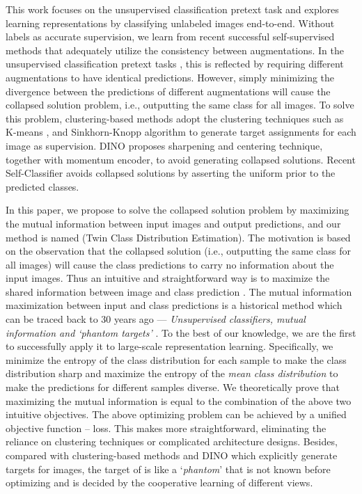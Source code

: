 \documentclass[10pt,twocolumn,letterpaper]{article}
\begin{document}
This work focuses on the unsupervised classification pretext task and explores learning representations by classifying unlabeled images end-to-end. Without labels as accurate supervision, we learn from recent successful self-supervised methods \cite{he2020momentum, chen2020simple, caron2020unsupervised, caron2021emerging} that adequately utilize the consistency between augmentations. In the unsupervised classification pretext tasks \cite{caron2020unsupervised, caron2021emerging}, this is reflected by requiring different augmentations to have identical predictions.
However, simply minimizing the divergence between the predictions of different augmentations will cause the collapsed solution problem, i.e., outputting the same class for all images. To solve this problem, clustering-based methods \cite{caron2018deep, asano2019self, li2020prototypical, caron2019unsupervised, caron2020unsupervised} adopt the clustering techniques such as K-means \cite{caron2018deep, li2020prototypical}, and Sinkhorn-Knopp algorithm \cite{asano2019self, caron2020unsupervised} to generate 
target assignments for each image as supervision. DINO \cite{caron2021emerging} proposes sharpening and centering technique, together with momentum encoder, to avoid generating collapsed solutions. 
Recent Self-Classifier \cite{amrani2021self} 
avoids collapsed solutions by asserting the uniform prior to the predicted classes. 

In this paper, we propose to solve the collapsed solution problem by maximizing the mutual information between input images and output predictions, and our method is named \ourmethod (Twin Class Distribution Estimation). The motivation is based on the observation that the collapsed solution (i.e., outputting the same class for all images) will cause the class predictions to carry no information about the input images. Thus an intuitive and straightforward way is to maximize the shared information between image  and class prediction . The mutual information maximization between input and class predictions is a historical method which can be traced back to 30 years ago --- \textit{Unsupervised  classifiers,  mutual  information  and `phantom targets'} \cite{bridle1992unsupervised}. To the best of our knowledge, we are the first to successfully apply it to large-scale representation learning. Specifically, we minimize the entropy of the class distribution for each sample to make the class distribution sharp and maximize the entropy of the \textit{mean class distribution} to make the predictions for different samples diverse. We theoretically prove that maximizing the mutual information is equal to the combination of the above two intuitive objectives. The above optimizing problem can be achieved by a unified objective function -- \ourmethod loss. This makes \ourmethod more straightforward, eliminating the reliance on clustering techniques or complicated architecture designs. Besides, compared with clustering-based methods and DINO which explicitly generate targets for images, the target of \ourmethod is like a `\textit{phantom}' that is not known before optimizing and is decided by the cooperative learning of different views. 
 
\end{document}
